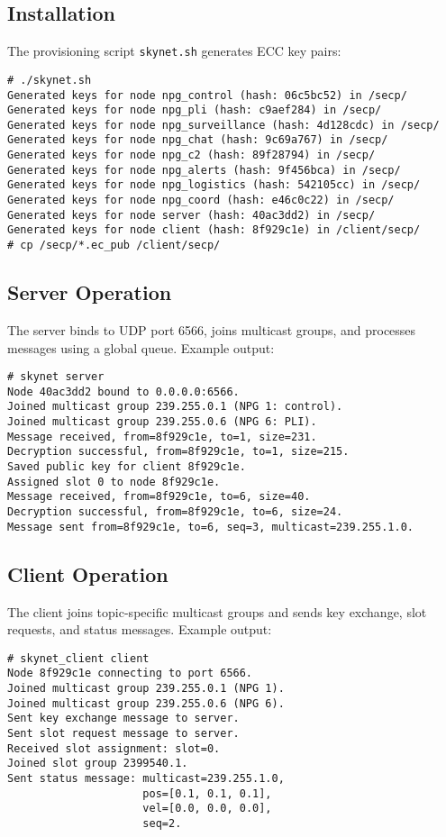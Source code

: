 \documentclass{article}
\begin{document}
\newpage
\subsection{Installation}
The provisioning script \texttt{skynet.sh} generates ECC key pairs:
\begin{lstlisting}
# ./skynet.sh
Generated keys for node npg_control (hash: 06c5bc52) in /secp/
Generated keys for node npg_pli (hash: c9aef284) in /secp/
Generated keys for node npg_surveillance (hash: 4d128cdc) in /secp/
Generated keys for node npg_chat (hash: 9c69a767) in /secp/
Generated keys for node npg_c2 (hash: 89f28794) in /secp/
Generated keys for node npg_alerts (hash: 9f456bca) in /secp/
Generated keys for node npg_logistics (hash: 542105cc) in /secp/
Generated keys for node npg_coord (hash: e46c0c22) in /secp/
Generated keys for node server (hash: 40ac3dd2) in /secp/
Generated keys for node client (hash: 8f929c1e) in /client/secp/
# cp /secp/*.ec_pub /client/secp/
\end{lstlisting}

\subsection{Server Operation}
The server binds to UDP port 6566, joins multicast groups, and processes messages using a global
queue. Example output:
\begin{lstlisting}
# skynet server
Node 40ac3dd2 bound to 0.0.0.0:6566.
Joined multicast group 239.255.0.1 (NPG 1: control).
Joined multicast group 239.255.0.6 (NPG 6: PLI).
Message received, from=8f929c1e, to=1, size=231.
Decryption successful, from=8f929c1e, to=1, size=215.
Saved public key for client 8f929c1e.
Assigned slot 0 to node 8f929c1e.
Message received, from=8f929c1e, to=6, size=40.
Decryption successful, from=8f929c1e, to=6, size=24.
Message sent from=8f929c1e, to=6, seq=3, multicast=239.255.1.0.
\end{lstlisting}

\subsection{Client Operation}
The client joins topic-specific multicast groups and sends key exchange, slot requests, and status
messages. Example output:
\begin{lstlisting}
# skynet_client client
Node 8f929c1e connecting to port 6566.
Joined multicast group 239.255.0.1 (NPG 1).
Joined multicast group 239.255.0.6 (NPG 6).
Sent key exchange message to server.
Sent slot request message to server.
Received slot assignment: slot=0.
Joined slot group 2399540.1.
Sent status message: multicast=239.255.1.0,
                     pos=[0.1, 0.1, 0.1],
                     vel=[0.0, 0.0, 0.0],
                     seq=2.
\end{lstlisting}
\end{document}

